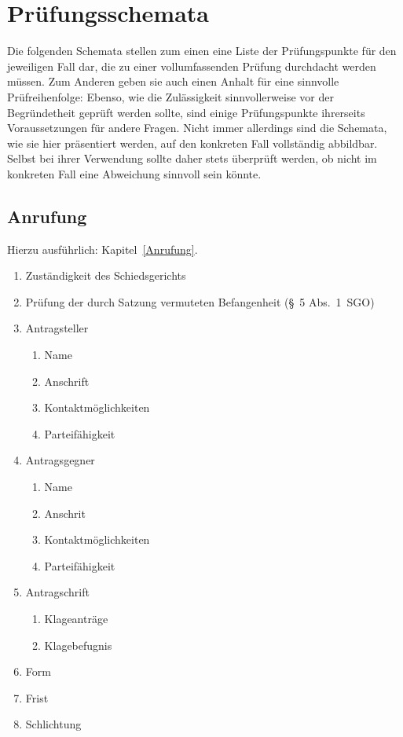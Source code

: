 
\chapter{Prüfungsschemata}
\label{Schemata}

Die folgenden Schemata stellen zum einen eine Liste der Prüfungspunkte für den jeweiligen Fall dar, die zu einer vollumfassenden Prüfung durchdacht werden müssen.
Zum Anderen geben sie auch einen Anhalt für eine sinnvolle Prüfreihenfolge:
Ebenso, wie die Zulässigkeit sinnvollerweise vor der Begründetheit geprüft werden sollte, sind einige Prüfungspunkte ihrerseits Voraussetzungen für andere Fragen.
Nicht immer allerdings sind die Schemata, wie sie hier präsentiert werden, auf den konkreten Fall vollständig abbildbar.
Selbst bei ihrer Verwendung sollte daher stets überprüft werden, ob nicht im konkreten Fall eine Abweichung sinnvoll sein könnte.

\section{Anrufung}
\label{Schemata:Anrufung}
Hierzu ausführlich: Kapitel~\ref{Anrufung}.

\begin{enumerate}[label=\Roman*.]
\item Zuständigkeit des Schiedsgerichts
\item Prüfung der durch Satzung vermuteten Befangenheit (\S~5 Abs.~1~SGO)
\item Antragsteller
	\begin{enumerate}
	\item Name
	\item Anschrift
	\item Kontaktmöglichkeiten
	\item Parteifähigkeit
	\end{enumerate}
\item Antragsgegner
	\begin{enumerate}
	\item Name
	\item Anschrit
	\item Kontaktmöglichkeiten
	\item Parteifähigkeit
	\end{enumerate}
\item Antragschrift
	\begin{enumerate}
	\item Klageanträge
	\item Klagebefugnis
	\end{enumerate}
\item Form
\item Frist
\item Schlichtung
\end{enumerate}

